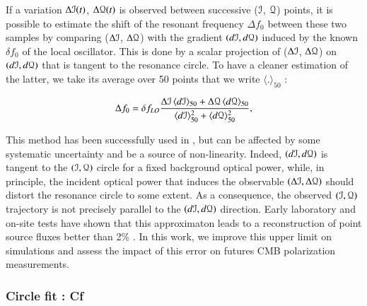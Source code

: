 \subsubsection{\rf}
If a variation $\Delta\mathcal{I}(t)$, $\Delta\mathcal{Q}(t)$ is observed between successive ($\mathcal{I}$,
$\mathcal{Q}$) points, it is possible to estimate the shift of the resonant frequency
$\Delta f_{0}$ between these two samples by comparing ($\Delta \mathcal{I}$, $\Delta \mathcal{Q}$)
with the gradient $(d\mathcal{I},d\mathcal{Q})$ induced by the known $\delta
f_{0}$ of the local oscillator. This is done by a scalar projection of ($\Delta\mathcal{I}$,
$\Delta\mathcal{Q}$) on $(d\mathcal{I},d\mathcal{Q})$ that is tangent to the resonance circle. To have a
cleaner estimation of the latter, we take its average over 50
points that we write $\langle . \rangle_{50}$ \citep{2014A&A...569A...9C}:

\begin{equation}
\label{eq:Rf}
\Delta f_{0} = \delta f_{LO} \frac{\Delta \mathcal{I}\, \langle d\mathcal{I}
  \rangle_{50}
+ \Delta \mathcal{Q}\, \langle d\mathcal{Q} \rangle_{50}}{\langle d\mathcal{I}
  \rangle_{50}^{2}
 + \langle d\mathcal{Q} \rangle_{50}^{2}},
\end{equation}



This method has been successfully used in , but can be affected by
some systematic uncertainty and be a source of non-linearity. Indeed,
$(d\mathcal{I},d\mathcal{Q})$ is tangent to the $(\mathcal{I},\mathcal{Q})$ circle for a fixed background optical
power, while, in principle, the incident optical power that induces the
observable $(\Delta \mathcal{I}, \Delta \mathcal{Q})$ should distort the resonance circle to some
extent. As a consequence, the observed $(\mathcal{I},\mathcal{Q})$ trajectory is not precisely
parallel to the $(d\mathcal{I},d\mathcal{Q})$ direction. Early laboratory and on-site tests have
shown that this approximaton leads to a reconstruction of point source fluxes
better than 2\% \citep{2013A&A...551L..12C}. In this work, we improve this upper
limit on simulations and assess the impact of this error on futures CMB
polarization measurements.

\subsubsection{Circle fit : Cf}

